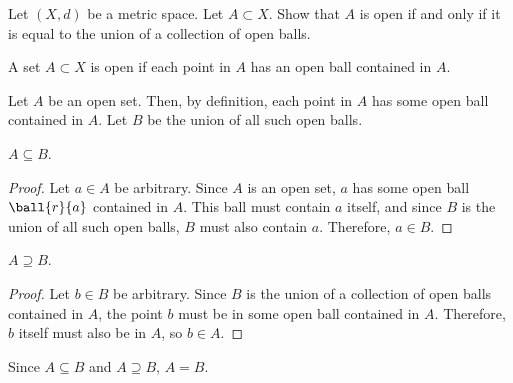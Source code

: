 \begin{problem}
  Let $(X, d)$ be a metric space.
  Let $A \subset X$.
  Show that $A$ is open if and only if it is equal
  to the union of a collection of open balls.
\end{problem}

\begin{answer}
  \begin{definition}
    A set $A \subset X$ is open if each point in $A$ has an open ball
    contained in $A$.
  \end{definition}

  \step
  Let $A$ be an open set.
  Then, by definition, each point in $A$ has some open ball contained in $A$.
  Let $B$ be the union of all such open balls.
  
  \begin{claim}
    $A \subseteq B$.
    \begin{proof}
      Let $a \in A$ be arbitrary.
      Since $A$ is an open set, $a$ has some open ball $\ball{r}{a}$ contained in $A$.
      This ball must contain $a$ itself, and since $B$ is the union of all such open balls,
      $B$ must also contain $a$. Therefore, $a \in B$.
    \end{proof}
  \end{claim}

  \begin{claim}
    $A \supseteq B$.
    \begin{proof}
      Let $b \in B$ be arbitrary.
      Since $B$ is the union of a collection of open balls contained in
      $A$, the point $b$ must be in some open ball contained in $A$.
      Therefore, $b$ itself must also be in $A$, so $b \in A$.
    \end{proof}
  \end{claim}

  \step
  Since $A \subseteq B$ and $A \supseteq B$, $A = B$.
\end{answer}
